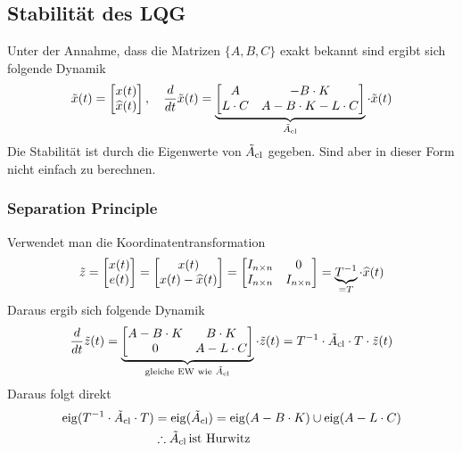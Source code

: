 \subsection{Stabilität des LQG}
    Unter der Annahme, dass die Matrizen $\{A, B, C\}$ exakt bekannt sind ergibt sich folgende Dynamik
    \begin{equation*}
        \Tilde{x}(t) = \begin{bmatrix}x(t)\\\widehat{x}(t)\end{bmatrix},\quad
        \frac{d}{dt}\Tilde{x}(t) = 
        \underbrace{\begin{bmatrix}
        A   &   -B\cdot K\\
        L\cdot C & A-B\cdot K-L\cdot C
        \end{bmatrix}}_{\Tilde{A}_{\textnormal{cl}}}
        \cdot \Tilde{x}(t)
    \end{equation*}
    Die Stabilität ist durch die Eigenwerte von $\Tilde{A}_{\textnormal{cl}}$ gegeben. Sind aber in dieser Form nicht einfach zu berechnen.
    
    \subsubsection{Separation Principle}
        Verwendet man die Koordinatentransformation
        \begin{equation*}
            \Tilde{z} = 
            \begin{bmatrix}
            x(t)\\e(t)
            \end{bmatrix}
            =
            \begin{bmatrix}
            x(t)\\x(t)-\widehat{x}(t)
            \end{bmatrix}
            =
            \begin{bmatrix}
            I_{n\times n} & 0\\I_{n\times n} & I_{n\times n}
            \end{bmatrix}
            = \underbrace{T^{-1}}_{=T}\cdot\widehat{x}(t)
        \end{equation*}
        Daraus ergib sich folgende Dynamik
        \begin{equation*} 
            \frac{d}{dt}\Tilde{z}(t) = 
            \underbrace{\begin{bmatrix}
            A-B\cdot K   &   B\cdot K\\
            0 & A-L\cdot C
            \end{bmatrix}}_{\textnormal{gleiche EW wie }\Tilde{A}_{\textnormal{cl}}}
            \cdot\Tilde{z}(t) = T^{-1}\cdot\Tilde{A}_\textnormal{cl}\cdot T\cdot\Tilde{z}(t)
        \end{equation*}
        Daraus folgt direkt
        \begin{align*}
            \operatorname{eig}(T^{-1}\cdot\Tilde{A}_\textnormal{cl}\cdot T) &= \operatorname{eig}(\Tilde{A}_\textnormal{cl}) = \operatorname{eig}(A-B\cdot K)\cup \operatorname{eig}(A-L\cdot C)\\ 
            &\therefore \Tilde{A}_\textnormal{cl}\,\textnormal{ist Hurwitz}
        \end{align*}